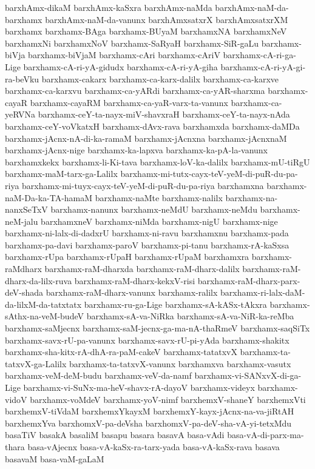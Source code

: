 {barxhAmx-dikaM
barxhAmx-kaSxra
barxhAmx-naMda
barxhAmx-naM-da-barxhamx
barxhAmx-naM-da-vanunx
barxhAmxsatxrX
barxhAmxsatxrXM
barxhamx
barxhamx-BAga
barxhamx-BUyaM
barxhamxNA
barxhamxNeV
barxhamxNi
barxhamxNoV
barxhamx-SaRyaH
barxhamx-SiR-gaLu
barxhamx-biVja
barxhamx-biVjaM
barxhamx-cAri
barxhamx-cAriV
barxhamx-cA-ri-ga-Lige
barxhamx-cA-ri-yA-gidudx
barxhamx-cA-ri-yA-giha
barxhamx-cA-ri-yA-gi-ra-beVku
barxhamx-cakarx
barxhamx-ca-karx-dalilx
barxhamx-ca-karxve
barxhamx-ca-karxvu
barxhamx-ca-yARdi
barxhamx-ca-yAR-sharxma
barxhamx-cayaR
barxhamx-cayaRM
barxhamx-ca-yaR-varx-ta-vanunx
barxhamx-ca-yeRVNa
barxhamx-ceY-ta-nayx-miV-shavxraH
barxhamx-ceY-ta-nayx-nAda
barxhamx-ceY-voVkatxH
barxhamx-dAvx-rava
barxhamxda
barxhamx-daMDa
barxhamx-jAcnx-nA-di-ka-ramaM
barxhamx-jAcnxna
barxhamx-jAcnxnaM
barxhamx-jAcnx-nige
barxhamx-ka-lapxva
barxhamx-ka-pA-la-vanunx
barxhamxkekx
barxhamx-li-Ki-tava
barxhamx-loV-ka-dalilx
barxhamx-mU-tiRgU
barxhamx-maM-tarx-ga-Lalilx
barxhamx-mi-tutx-cayx-teV-yeM-di-puR-du-pa-riya
barxhamx-mi-tuyx-cayx-teV-yeM-di-puR-du-pa-riya
barxhamxna
barxhamx-naM-Da-ka-TA-hamaM
barxhamx-naMte
barxhamx-nalilx
barxhamx-na-nanxSeTxV
barxhamx-nanunx
barxhamx-neMdU
barxhamx-neMdu
barxhamx-neM-jalu
barxhamxneV
barxhamx-niMda
barxhamx-nigU
barxhamx-nige
barxhamx-ni-lalx-di-dadxrU
barxhamx-ni-ravu
barxhamxnu
barxhamx-pada
barxhamx-pa-davi
barxhamx-paroV
barxhamx-pi-tanu
barxhamx-rA-kaSxsa
barxhamx-rUpa
barxhamx-rUpaH
barxhamx-rUpaM
barxhamxra
barxhamx-raMdharx
barxhamx-raM-dharxda
barxhamx-raM-dharx-dalilx
barxhamx-raM-dharx-da-lilx-ruva
barxhamx-raM-dharx-kekxV-risi
barxhamx-raM-dharx-parx-deV-shada
barxhamx-raM-dharx-vanunx
barxhamx-ralilx
barxhamx-ri-lalx-daM-da-lilxM-da-tatxtatx
barxhamx-ru-ga-Lige
barxhamx-sA-kASx-tAkxra
barxhamx-sAthx-na-veM-budeV
barxhamx-sA-va-NiRka
barxhamx-sA-va-NiR-ka-reMba
barxhamx-saMjecnx
barxhamx-saM-jecnx-ga-ma-nA-thaRmeV
barxhamx-saqSiTx
barxhamx-savx-rU-pa-vanunx
barxhamx-savx-rU-pi-yAda
barxhamx-shakitx
barxhamx-sha-kitx-rA-dhA-ra-paM-cakeV
barxhamx-tatatxvX
barxhamx-ta-tatxvX-ga-Lalilx
barxhamx-ta-tatxvX-vanunx
barxhamxva
barxhamx-vasutx
barxhamx-veM-deM-budu
barxhamx-veV-da-namf
barxhamx-vi-SANxvX-di-ga-Lige
barxhamx-vi-SuNx-ma-heV-shavx-rA-dayoV
barxhamx-videyx
barxhamx-vidoV
barxhamx-voMdeV
barxhamx-yoV-nimf
barxhemxV-shaneY
barxhemxVti
barxhemxV-tiVdaM
barxhemxYkayxM
barxhemxY-kayx-jAcnx-na-va-jiRtAH
barxhemxYva
barxhomxV-pa-deVsha
barxhomxV-pa-deV-sha-vA-yi-tetxMdu
basaTiV
basakA
basaliM
basapu
basara
basavA
basa-vAdi
basa-vA-di-parx-ma-thara
basa-vAjecnx
basa-vA-kaSx-ra-tarx-yada
basa-vA-kaSx-rava
basava
basavaM
basa-vaM-gaLaM
}
